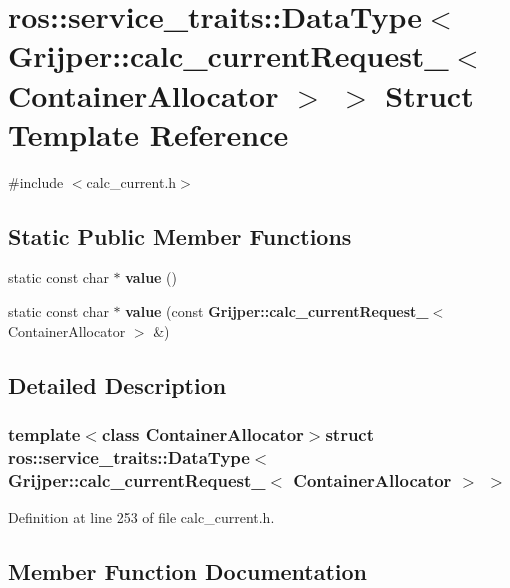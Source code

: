 \section{ros\-:\-:service\-\_\-traits\-:\-:Data\-Type$<$ Grijper\-:\-:calc\-\_\-current\-Request\-\_\-$<$ Container\-Allocator $>$ $>$ Struct Template Reference}
\label{structros_1_1service__traits_1_1DataType_3_01Grijper_1_1calc__currentRequest___3_01ContainerAllocator_01_4_01_4}


{\ttfamily \#include $<$calc\-\_\-current.\-h$>$}

\subsection*{Static Public Member Functions}
\begin{DoxyCompactItemize}
\item 
static const char $\ast$ {\bf value} ()
\item 
static const char $\ast$ {\bf value} (const {\bf Grijper\-::calc\-\_\-current\-Request\-\_\-}$<$ Container\-Allocator $>$ \&)
\end{DoxyCompactItemize}


\subsection{Detailed Description}
\subsubsection*{template$<$class Container\-Allocator$>$struct ros\-::service\-\_\-traits\-::\-Data\-Type$<$ Grijper\-::calc\-\_\-current\-Request\-\_\-$<$ Container\-Allocator $>$ $>$}



Definition at line 253 of file calc\-\_\-current.\-h.



\subsection{Member Function Documentation}
